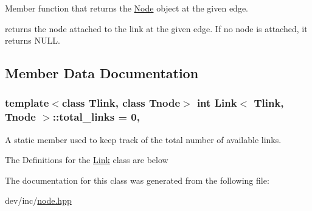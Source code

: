 Member function that returns the \hyperlink{classNode}{Node} object at the given edge. 

returns the node attached to the link at the given edge. If no node is attached, it returns N\-U\-L\-L. 

\subsection{Member Data Documentation}
\hypertarget{classLink_ad240a01b7643e780f7472bf5058f2151}{
\subsubsection[{total\-\_\-links}]{\setlength{\rightskip}{0pt plus 5cm}template$<$class Tlink, class Tnode$>$ int {\bf Link}$<$ Tlink, Tnode $>$\-::total\-\_\-links = 0\hspace{0.3cm}{\ttfamily [static]}, {\ttfamily [private]}}}\label{classLink_ad240a01b7643e780f7472bf5058f2151}


A static member used to keep track of the total number of available links. 

The Definitions for the \hyperlink{classLink}{Link} class are below 

The documentation for this class was generated from the following file\-:\begin{DoxyCompactItemize}
\item 
dev/inc/\hyperlink{node_8hpp}{node.\-hpp}\end{DoxyCompactItemize}
